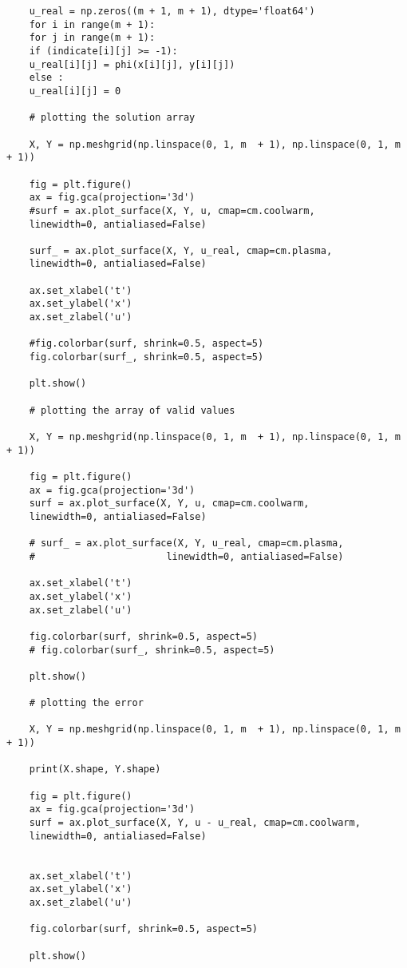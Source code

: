 \begin{verbatim}
	u_real = np.zeros((m + 1, m + 1), dtype='float64')
	for i in range(m + 1):
	for j in range(m + 1):
	if (indicate[i][j] >= -1):
	u_real[i][j] = phi(x[i][j], y[i][j])
	else :
	u_real[i][j] = 0
	
	# plotting the solution array
	
	X, Y = np.meshgrid(np.linspace(0, 1, m  + 1), np.linspace(0, 1, m  + 1))
	
	fig = plt.figure()
	ax = fig.gca(projection='3d')
	#surf = ax.plot_surface(X, Y, u, cmap=cm.coolwarm,
	linewidth=0, antialiased=False)
	
	surf_ = ax.plot_surface(X, Y, u_real, cmap=cm.plasma,
	linewidth=0, antialiased=False)
	
	ax.set_xlabel('t')
	ax.set_ylabel('x')
	ax.set_zlabel('u')
	
	#fig.colorbar(surf, shrink=0.5, aspect=5)
	fig.colorbar(surf_, shrink=0.5, aspect=5)
	
	plt.show()
	
	# plotting the array of valid values
	
	X, Y = np.meshgrid(np.linspace(0, 1, m  + 1), np.linspace(0, 1, m  + 1))
	
	fig = plt.figure()
	ax = fig.gca(projection='3d')
	surf = ax.plot_surface(X, Y, u, cmap=cm.coolwarm,
	linewidth=0, antialiased=False)
	
	# surf_ = ax.plot_surface(X, Y, u_real, cmap=cm.plasma,
	#                       linewidth=0, antialiased=False)
	
	ax.set_xlabel('t')
	ax.set_ylabel('x')
	ax.set_zlabel('u')
	
	fig.colorbar(surf, shrink=0.5, aspect=5)
	# fig.colorbar(surf_, shrink=0.5, aspect=5)
	
	plt.show()
	
	# plotting the error
	
	X, Y = np.meshgrid(np.linspace(0, 1, m  + 1), np.linspace(0, 1, m  + 1))
	
	print(X.shape, Y.shape)
	
	fig = plt.figure()
	ax = fig.gca(projection='3d')
	surf = ax.plot_surface(X, Y, u - u_real, cmap=cm.coolwarm,
	linewidth=0, antialiased=False)
	
	
	ax.set_xlabel('t')
	ax.set_ylabel('x')
	ax.set_zlabel('u')
	
	fig.colorbar(surf, shrink=0.5, aspect=5)
	
	plt.show()

	\end{verbatim}
	
